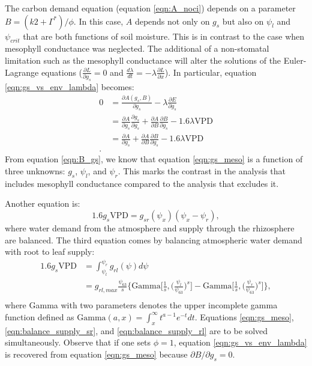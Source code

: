 \documentclass[utf8]{frontiersSCNS} %
\begin{document}
The carbon demand equation (equation \ref{eqn:A_noci}) depends on a parameter $B=(k2 + \Gamma^*)/\phi$. In this case, $A$ depends not only on $g_s$ but also on $\psi_l$ and $\psi_{crit}$ that are both functions of soil moisture. This is in contrast to the case when mesophyll conductance was neglected. The additional of a non-stomatal limitation such as the mesophyll conductance will alter the solutions of the Euler-Lagrange equations ($\frac{\partial L}{\partial g_s}=0$ and $\frac{d \lambda}{dt}=-\lambda \frac{\partial L}{\partial x}$).
In particular, equation \ref{eqn:gs_vs_env_lambda} becomes:
\begin{equation}
    \label{eqn:gs_meso}
    \begin{split}
        0 &= \frac{\partial A(g_s, B)}{\partial g_s} - \lambda \frac{\partial E}{\partial g_s}\\
        &= \frac{\partial A}{\partial g_s} \frac{\partial g_s}{\partial g_s} + \frac{\partial A}{\partial B} \frac{\partial B}{\partial g_s} - 1.6 \lambda \text{VPD}\\
        &= \frac{\partial A}{\partial g_s} + \frac{\partial A}{\partial B} \frac{\partial B}{\partial g_s} - 1.6 \lambda \text{VPD}\\.
    \end{split} 
\end{equation}
From equation \ref{eqn:B_gs}, we know that equation \ref{eqn:gs_meso} is a function of three unknowns: $g_s$, $\psi_l$, and $\psi_r$. This marks the contrast in the analysis that includes mesophyll conductance compared to the analysis that excludes it.

Another equation is:
\begin{equation}
    \label{eqn:balance_supply_sr}
    1.6 g_s \text{VPD} = g_{sr}(\psi_x)(\psi_x - \psi_r),
\end{equation}
where water demand from the atmosphere and supply through the rhizosphere are balanced. The third equation comes by balancing atmospheric water demand with root to leaf supply:
\begin{equation}
    \label{eqn:balance_supply_rl}
    \begin{split}
        1.6 g_s \text{VPD} &= \int_{\psi_l}^{\psi_r} g_{rl}(\psi) d\psi\\
        &= g_{rl,max}\frac{\psi_{63}}{s} \Bigg\{\text{Gamma}\Bigg[\frac{1}{s}, \Big(\frac{\psi_l}{\psi_{63}}\Big)^s\Bigg] - \text{Gamma}\Bigg[\frac{1}{s}, \Big(\frac{\psi_r}{\psi_{63}}\Big)^s\Bigg] \Bigg\},\\
    \end{split}
\end{equation}
where Gamma with two parameters denotes the upper incomplete gamma function defined as $\text{Gamma}(a,x) = \int_x^\infty t^{a-1} e^{-t} dt$. Equations \ref{eqn:gs_meso}, \ref{eqn:balance_supply_sr}, and \ref{eqn:balance_supply_rl} are to be solved simultaneously. Observe that if one sets $\phi=1$, equation \ref{eqn:gs_vs_env_lambda} is recovered from equation \ref{eqn:gs_meso} because $\partial B / \partial g_s = 0$.
\end{document}
